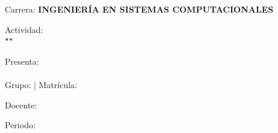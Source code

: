 \begin{titlepage}
\begin{center}
        \vspace{0.8cm}
        \large
        Carrera: \textbf{INGENIERÍA EN SISTEMAS COMPUTACIONALES}
        
        \vspace{0.8cm}
        {\large
        Actividad: \descripcion \\
        \textbf{"\myActivity"}\\[0.3cm]
        }

        \vspace{0.8cm}
        \begin{flushleft}
        {\large
            Presenta:\\    
            \textbf{\authora}\\
            Grupo: \textbf{\myGroup} | Matrícula: \textbf{\myControlNumber}
        }
        \end{flushleft}

        \begin{flushright}
        {\large
            Docente:\\
            \textbf{\myReviewers}
        }
        \end{flushright}
        
        \vfill
        
        {\large Periodo: \myPeriod}\\
        \vspace{0.3cm}
        {\large \myDate}
        
    \end{center}
\end{titlepage}
